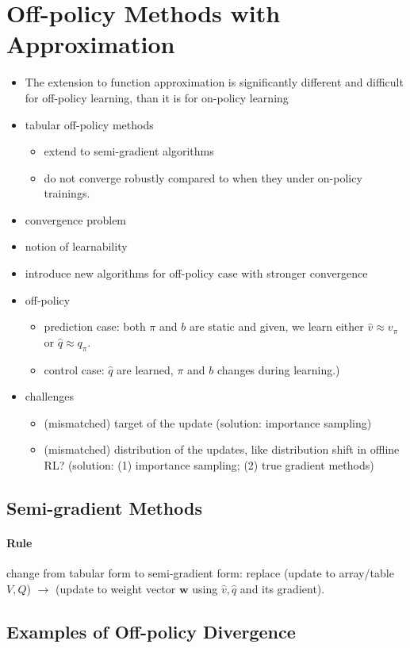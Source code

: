 \documentclass[sutton_barto_notes.tex]{subfiles}
\begin{document}
\newpage
\section{Off-policy Methods with Approximation}

\begin{itemize}
\item The extension to function approximation is significantly different and difficult for off-policy learning, than it is for on-policy learning
\item tabular off-policy methods
\begin{itemize}
	\item extend to semi-gradient algorithms
	\item do not converge robustly compared to when they under on-policy trainings.
\end{itemize}
\item convergence problem
\item notion of learnability
\item introduce new algorithms for off-policy case with stronger convergence
\item off-policy
\begin{itemize}
	\item prediction case: both $\pi$ and $b$ are static and given, we learn either $\hat{v} \approx v_\pi$ or $\hat{q}\approx q_\pi$.
	\item control case: $\hat{q}$ are learned, $\pi$ and $b$ changes during learning.)
\end{itemize}
\item challenges
\begin{itemize}
\item (mismatched) target of the update (solution: importance sampling)
\item (mismatched) distribution of the updates, like distribution shift in offline RL? (solution: (1) importance sampling; (2) true gradient methods)
\end{itemize}
\end{itemize}

\subsection{Semi-gradient Methods}

\paragraph{Rule} change from tabular form to semi-gradient form: replace (update to array/table $V,Q$) $\rightarrow$ (update to weight vector $\bm{w}$ using $\hat{v},\hat{q}$ and its gradient).

\subsection{Examples of Off-policy Divergence}
\end{document}
